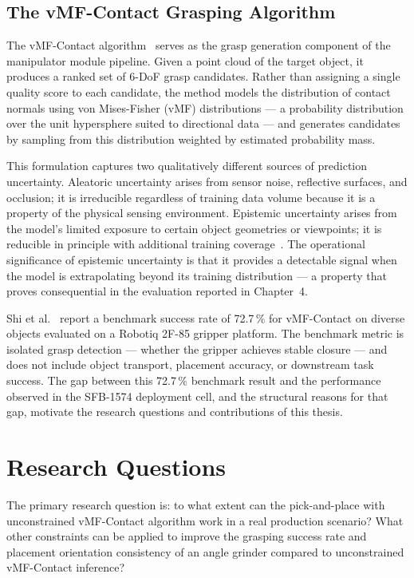 \documentclass[12pt, a4paper]{report}
\begin{document}
\subsection{The vMF-Contact Grasping Algorithm}
\label{sec:background-vmf-contact}

The vMF-Contact algorithm~\cite{shi2025} serves as the grasp generation component of the manipulator module pipeline. Given a point cloud of the target object, it produces a ranked set of 6-DoF grasp candidates. Rather than assigning a single quality score to each candidate, the method models the distribution of contact normals using von Mises-Fisher (vMF) distributions --- a probability distribution over the unit hypersphere suited to directional data --- and generates candidates by sampling from this distribution weighted by estimated probability mass.

This formulation captures two qualitatively different sources of prediction uncertainty. Aleatoric uncertainty arises from sensor noise, reflective surfaces, and occlusion; it is irreducible regardless of training data volume because it is a property of the physical sensing environment. Epistemic uncertainty arises from the model's limited exposure to certain object geometries or viewpoints; it is reducible in principle with additional training coverage~\cite{kendall2017uncertainties}. The operational significance of epistemic uncertainty is that it provides a detectable signal when the model is extrapolating beyond its training distribution --- a property that proves consequential in the evaluation reported in Chapter~4.

Shi et al.~\cite{shi2025} report a benchmark success rate of 72.7\,\% for vMF-Contact on diverse objects evaluated on a Robotiq 2F-85 gripper platform. The benchmark metric is isolated grasp detection --- whether the gripper achieves stable closure --- and does not include object transport, placement accuracy, or downstream task success. The gap between this 72.7\,\% benchmark result and the performance observed in the SFB-1574 deployment cell, and the structural reasons for that gap, motivate the research questions and contributions of this thesis.

\section{Research Questions}
\label{sec:research-questions}

The primary research question is: to what extent can the pick-and-place with unconstrained vMF-Contact algorithm work in a real production scenario? What other constraints can be applied to improve the grasping success rate and placement orientation consistency of an angle grinder compared to unconstrained vMF-Contact inference?
\end{document}
